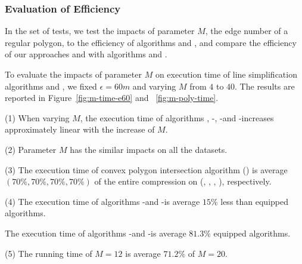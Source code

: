 \subsubsection{Evaluation of Efficiency}


In the set of tests, we test the impacts of parameter $M$, \ie the edge number of a regular polygon, to the efficiency of algorithms \cist and \cista, and compare the efficiency of our approaches \cist and \cista with algorithms \dps and \squishe.
%











To evaluate the impacts of parameter $M$ on execution time of line simplification algorithms \cist and \cista, we fixed $\epsilon =60m$ and varying $M$ from $4$ to $40$.
%
The results are reported in Figure~\ref{fig:m-time-e60} and ~\ref{fig:m-poly-time}.

\ni(1) When varying $M$, the execution time of algorithms \cist, \cist-\cpia, \cista-\rpia and \cista-\cpia increases approximately linear with the increase of $M$.

\ni(2) Parameter $M$ has the similar impacts on all the datasets.

\ni(3) The execution time of convex polygon intersection algorithm (\cpia) is average \textcolor[rgb]{1.00,0.00,0.00}{$(70\%, 70\%, 70\%, 70\%)$} of the entire compression on (\truck, \sercar, \geolife, \pricar), respectively.

\ni(4) The execution time of algorithms \cist-\rpia and \cista-\rpia is average \textcolor[rgb]{1.00,0.00,0.00}{$15\%$} less than \cpia equipped algorithms.

The execution time of algorithms \cist-\rpia and \cista-\rpia is average \textcolor[rgb]{1.00,0.00,0.00}{$81.3\%$} \cpia equipped algorithms.

\ni(5) The running time of $M=12$ is average \textcolor[rgb]{1.00,0.00,0.00}{$71.2\%$} of $M=20$.

